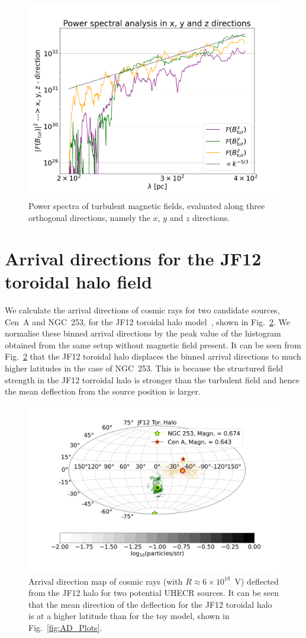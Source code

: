 \documentclass[usenatbib]{mnras}
\begin{document}
\begin{figure}
    \includegraphics[width = 0.49\linewidth]{Images/Jan27_Test_PowerSpectrum_vs_lambda_seed_10_lmin_200.0lmax_400.0.png}
    \caption{Power spectra of turbulent magnetic fields, evaluated along three orthogonal directions, namely the $x$, $y$ and $z$ directions.}
    \label{fig:PowerSpectrum}
\end{figure}

\section{Arrival directions for the JF12 toroidal halo field}
\label{Appendix_C}
We calculate the arrival directions of cosmic rays for two candidate sources, Cen~A and NGC~253, for the JF12 toroidal halo model~\citep{JF12}, shown in Fig.~\ref{JF12_AD}. We normalise these binned arrival directions by the peak value of the histogram obtained from the same setup without magnetic field present. It can be seen from Fig.~\ref{JF12_AD} that the JF12 toroidal halo displaces the binned arrival directions to much higher latitudes in the case of NGC~253. This is because the structured field strength in the JF12 torroidal halo is stronger than the turbulent field and hence the mean deflection from the source position is larger.
\begin{figure}
\centering
\includegraphics[width=0.60\linewidth]{Images/Bins_180_CenA_NGC253_JF12_Halo_40_EeV.png}
 \caption{Arrival direction map of cosmic rays (with $R \approx 6 \times 10^{18}$~V) deflected from the JF12 halo for two potential UHECR sources. It can be seen that the mean direction of the deflection for the JF12 toroidal halo is at a higher latitude than for the toy model, shown in Fig.~\ref{fig:AD_Plots}.}
\label{JF12_AD}
\end{figure}
\end{document}
